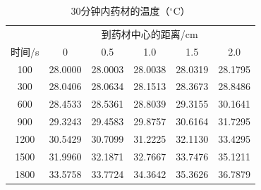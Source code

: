 \begin{table}[htbp]\centering\small
\caption{30分钟内药材的温度（$^\circ$C）}\label{tab_q1T}
\renewcommand{\arraystretch}{1.12}
\begin{tabular}{cccccc}\toprule
 & \multicolumn{5}{c}{到药材中心的距离/cm}\\
时间/s & 0 & 0.5 & 1.0 & 1.5 & 2.0\\\midrule
100 & 28.0000 & 28.0003 & 28.0038 & 28.0319 & 28.1795\\
300 & 28.0406 & 28.0634 & 28.1513 & 28.3673 & 28.8486\\
600 & 28.4533 & 28.5361 & 28.8039 & 29.3155 & 30.1641\\
900 & 29.3243 & 29.4583 & 29.8757 & 30.6164 & 31.7295\\
1200 & 30.5429 & 30.7099 & 31.2225 & 32.1130 & 33.4295\\
1500 & 31.9960 & 32.1871 & 32.7667 & 33.7476 & 35.1211\\
1800 & 33.5758 & 33.7724 & 34.3642 & 35.3626 & 36.7879\\
\bottomrule\end{tabular}
\end{table}
